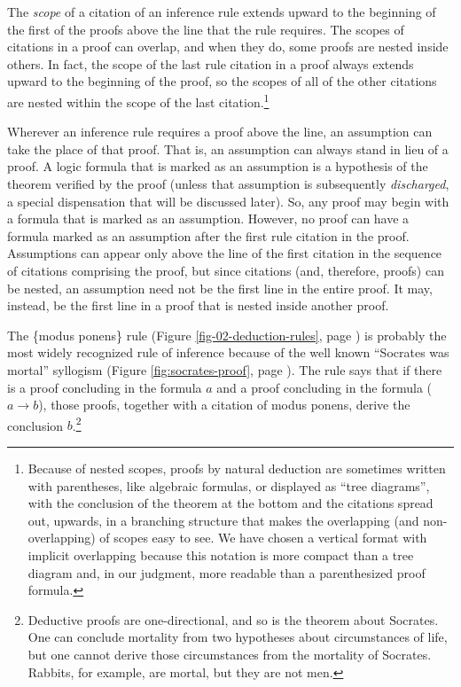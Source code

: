 The \emph{scope} of a
citation
of an inference rule
extends upward to the beginning of the first of the proofs
above the line that the rule requires.
The scopes of citations in a proof can overlap,
and when they do, some proofs are nested inside others.
In fact, the scope of the last rule citation in a proof
always extends upward to the beginning of the proof,
so the scopes of all of the other citations are nested
within the scope of the last citation.\footnote{Because
of nested scopes,
proofs by natural deduction
are sometimes written with parentheses,
like algebraic formulas,
or displayed as ``tree diagrams'',
with the conclusion of the theorem at the bottom and
the citations spread out, upwards,
in a branching structure
that makes the overlapping (and non-overlapping)
of scopes easy to see.
We have chosen a vertical format with implicit
overlapping because this notation is more compact than a
tree
diagram and, in our judgment,
more readable than a parenthesized proof formula.}

Wherever an inference rule requires a proof above the line,
an assumption can take the place of that proof.
That is,
an assumption can always stand in lieu of a proof.
A logic formula that is marked as an assumption
is a hypothesis of the theorem verified by the proof
(unless that assumption is subsequently \emph{discharged},
a special dispensation
that will be discussed later).
So, any proof may begin with a formula
that is marked as an assumption.
However, no proof can have
a formula marked as an assumption after
the first rule citation in the proof.
Assumptions
can appear only above the line
of the first citation in the sequence of citations
comprising the proof, but since citations
(and, therefore, proofs) can be nested,
an assumption need not be the first line in
the entire proof.
It may, instead, be the first line
in a proof that is nested inside another proof.

The \{modus ponens\} rule
(Figure \ref{fig-02-deduction-rules}, page \pageref{fig-02-deduction-rules})
is probably the most widely recognized rule of inference because
of the well known ``Socrates was mortal'' syllogism
(Figure \ref{fig:socrates-proof}, page \pageref{fig:socrates-proof}).
The rule says that if there is a proof concluding in
the formula $a$ and a proof concluding in the formula ($a \rightarrow b$),
those proofs, together with a citation of modus ponens,
derive the conclusion $b$.\footnote{Deductive
proofs are one-directional,
and so is the theorem about Socrates.
One can conclude mortality from two hypotheses about circumstances of life,
but one cannot derive those circumstances from the mortality of Socrates.
Rabbits, for example, are mortal, but they are not men.}

